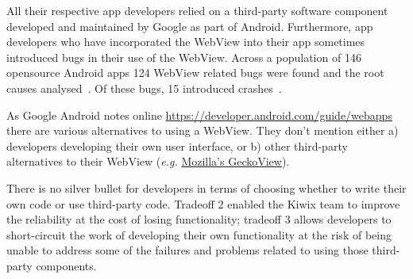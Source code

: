 All their respective app developers relied on a third-party software component developed and maintained by Google as part of Android. Furthermore, app developers who have incorporated the WebView into their app sometimes introduced bugs in their use of the WebView. Across a population of 146 opensource Android apps 124 WebView related bugs were found and the root causes analysed~\citep[pp. 704 - 706]{hu2018_a_tale_of_two_cities_how_webview_introduces_bugs_to_android_applications}. Of these bugs, 15 introduced crashes~\citep[p. 706]{hu2018_a_tale_of_two_cities_how_webview_introduces_bugs_to_android_applications}.

As Google Android notes online \url{https://developer.android.com/guide/webapps} there are various alternatives to using a WebView. They don't mention either a) developers developing their own user interface, or b) other third-party alternatives to their WebView (\emph{e.g.} \href{https://mozilla.github.io/geckoview/}{Mozilla's GeckoView}). 

There is no silver bullet for developers in terms of choosing whether to write their own code or use third-party code. Tradeoff 2 enabled the Kiwix team to improve the reliability at the cost of losing functionality; tradeoff 3 allows developers to short-circuit the work of developing their own functionality at the risk of being unable to address some of the failures and problems related to using those third-party components.

